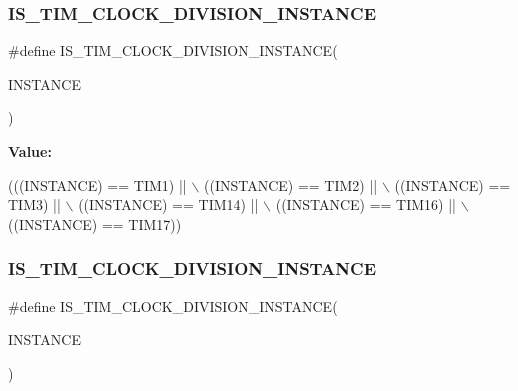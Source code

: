 \subsubsection{\texorpdfstring{I\+S\+\_\+\+T\+I\+M\+\_\+\+C\+L\+O\+C\+K\+\_\+\+D\+I\+V\+I\+S\+I\+O\+N\+\_\+\+I\+N\+S\+T\+A\+N\+CE}{IS\_TIM\_CLOCK\_DIVISION\_INSTANCE}\hspace{0.1cm}{\footnotesize\ttfamily [11/16]}}
{\footnotesize\ttfamily \#define I\+S\+\_\+\+T\+I\+M\+\_\+\+C\+L\+O\+C\+K\+\_\+\+D\+I\+V\+I\+S\+I\+O\+N\+\_\+\+I\+N\+S\+T\+A\+N\+CE(\begin{DoxyParamCaption}\item[{}]{I\+N\+S\+T\+A\+N\+CE }\end{DoxyParamCaption})}

{\bfseries Value\+:}
\begin{DoxyCode}
(((INSTANCE) == TIM1)    || \(\backslash\)
   ((INSTANCE) == TIM2)    || \(\backslash\)
   ((INSTANCE) == TIM3)    || \(\backslash\)
   ((INSTANCE) == TIM14)   || \(\backslash\)
   ((INSTANCE) == TIM16)   || \(\backslash\)
   ((INSTANCE) == TIM17))
\end{DoxyCode}
\mbox{\label{group___exported__macro_gac54b9f42e8ab07c41abe7d96d13d698a}} 
\subsubsection{\texorpdfstring{I\+S\+\_\+\+T\+I\+M\+\_\+\+C\+L\+O\+C\+K\+\_\+\+D\+I\+V\+I\+S\+I\+O\+N\+\_\+\+I\+N\+S\+T\+A\+N\+CE}{IS\_TIM\_CLOCK\_DIVISION\_INSTANCE}\hspace{0.1cm}{\footnotesize\ttfamily [12/16]}}
{\footnotesize\ttfamily \#define I\+S\+\_\+\+T\+I\+M\+\_\+\+C\+L\+O\+C\+K\+\_\+\+D\+I\+V\+I\+S\+I\+O\+N\+\_\+\+I\+N\+S\+T\+A\+N\+CE(\begin{DoxyParamCaption}\item[{}]{I\+N\+S\+T\+A\+N\+CE }\end{DoxyParamCaption})}

